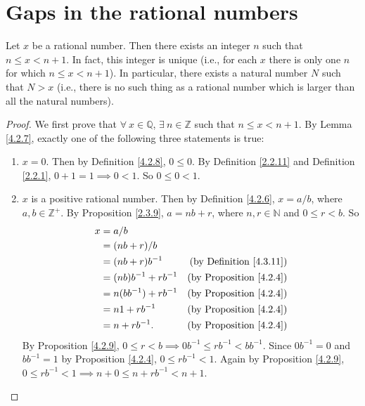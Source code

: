 \section{Gaps in the rational numbers}

\begin{proposition}\label{4.4.1}
Let \(x\) be a rational number.
Then there exists an integer \(n\) such that \(n \leq x < n + 1\).
In fact, this integer is unique (i.e., for each \(x\) there is only one \(n\) for which \(n \leq x < n + 1\)).
In particular, there exists a natural number \(N\) such that \(N > x\)
(i.e., there is no such thing as a rational number which is larger than all the natural numbers).
\end{proposition}

\begin{proof}
We first prove that \(\forall\ x \in \mathds{Q}\), \(\exists\ n \in \mathds{Z}\) such that \(n \leq x < n + 1\).
By Lemma \ref{4.2.7}, exactly one of the following three statements is true:
\begin{enumerate}
    \item \(x = 0\).
    Then by Definition \ref{4.2.8}, \(0 \leq 0\).
    By Definition \ref{2.2.11} and Definition \ref{2.2.1}, \(0 + 1 = 1 \implies 0 < 1\).
    So \(0 \leq 0 < 1\).
    \item \(x\) is a positive rational number.
    Then by Definition \ref{4.2.6}, \(x = a / b\), where \(a, b \in \mathds{Z}^+\).
    By Proposition \ref{2.3.9}, \(a = nb + r\), where \(n, r \in \mathds{N}\) and \(0 \leq r < b\).
    So
    \begin{align*}
    x &= a / b \\
    &= (nb + r) / b \\
    &= (nb + r)b^{-1} & \text{(by Definition \ref{4.3.11})} \\
    &= (nb)b^{-1} + rb^{-1} & \text{(by Proposition \ref{4.2.4})} \\
    &= n(bb^{-1}) + rb^{-1} & \text{(by Proposition \ref{4.2.4})} \\
    &= n1 + rb^{-1} & \text{(by Proposition \ref{4.2.4})} \\
    &= n + rb^{-1}. & \text{(by Proposition \ref{4.2.4})}
    \end{align*}
    By Proposition \ref{4.2.9}, \(0 \leq r < b \implies 0b^{-1} \leq rb^{-1} < bb^{-1}\).
    Since \(0b^{-1} = 0\) and \(bb^{-1} = 1\) by Proposition \ref{4.2.4}, \(0 \leq rb^{-1} < 1\).
    Again by Proposition \ref{4.2.9}, \(0 \leq rb^{-1} < 1 \implies n + 0 \leq n + rb^{-1} < n + 1\).

\end{enumerate}
\end{proof}
